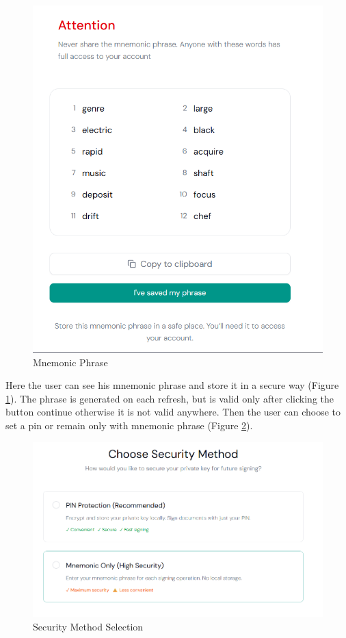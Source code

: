 \begin{figure}[H]
    \centering
    \includegraphics[width=18cm]{"images/siteUI/mnemonicPhrase.png"}
    \caption{Mnemonic Phrase}
    \label{mnemonic-phrase}
\end{figure}

Here the user can see his mnemonic phrase and store it in a secure way (Figure \ref{mnemonic-phrase}). The phrase is generated on each refresh, but is valid only after clicking the button continue otherwise it is not valid anywhere. Then the user can choose to set a pin or remain only with mnemonic phrase (Figure \ref{security-method}).

\begin{figure}[H]
    \centering
    \includegraphics[width=18cm]{"images/siteUI/securityMethod.png"}
    \caption{Security Method Selection}
    \label{security-method}
\end{figure}

